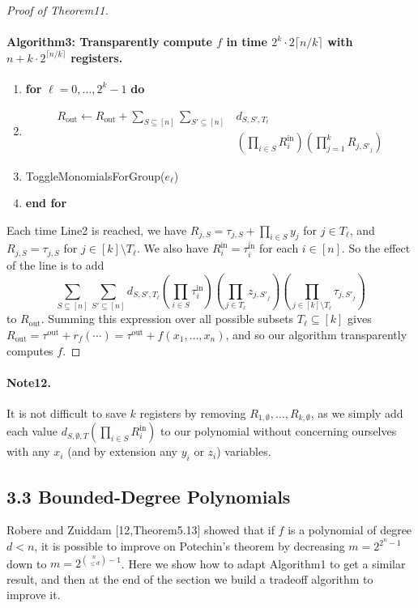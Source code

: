 \documentclass[10pt,a4paper]{article}
\begin{document}
\begin{proof}[Proof of Theorem11]
\paragraph{Algorithm3: Transparently compute $f$ in time $2^k\cdot2\lceil n/k\rceil$ with $n+k\cdot2^{\lceil n/k\rceil}$ registers.}
\begin{enumerate}[label=\arabic*:]
\item \textbf{for} $\ell=0,\ldots,2^k-1$ \textbf{do}
\item \[\begin{aligned}R_{\mathrm{out}}\leftarrow R_{\mathrm{out}}+\sum_{S\subseteq[n]}\sum_{S'\subseteq[n]}&d_{S,S',T_{\ell}}\\
&\mathord{}(\prod_{i\in S}R_i^{\mathrm{in}})(\prod_{j=1}^kR_{j,S'_j})\end{aligned}\]
\item ToggleMonomialsForGroup($e_{\ell}$)
\item \textbf{end for}
\end{enumerate}
Each time Line2 is reached, we have $R_{j,S}=\tau_{j,S}+\prod_{i\in S}y_j$ for $j\in T_{\ell}$, and $R_{j,S}=\tau_{j,S}$ for $j\in[k]\setminus T_{\ell}$. We also have $R_i^{\mathrm{in}}=\tau_i^{\mathrm{in}}$ for each $i\in[n]$. So the effect of the line is to add
\[\sum_{S\subseteq[n]}\sum_{S'\subseteq[n]}d_{S,S',T_{\ell}}\left(\prod_{i\in S}\tau_i^{\mathrm{in}}\right)\left(\prod_{j\in T_{\ell}}z_{j,S'_j}\right)\left(\prod_{j\in[k]\setminus T_{\ell}}\tau_{j,S'_j}\right)\]
to $R_{\mathrm{out}}$. Summing this expression over all possible subsets $T_{\ell}\subseteq[k]$ gives $R_{\mathrm{out}}=\tau^{\mathrm{out}}+r_f(\cdots)=\tau^{\mathrm{out}}+f(x_1,\ldots,x_n)$, and so our algorithm transparently computes $f$.
\end{proof}
\paragraph{Note12.} It is not difficult to save $k$ registers by removing $R_{1,\emptyset},\ldots,R_{k,\emptyset}$, as we simply add each value $d_{S,\emptyset,T}(\prod_{i\in S}R_i^{\mathrm{in}})$ to our polynomial without concerning ourselves with any $x_i$ (and by extension any $y_i$ or $z_i$) variables.

\subsection*{3.3 Bounded-Degree Polynomials}
Robere and Zuiddam [12,Theorem5.13] showed that if $f$ is a polynomial of degree $d<n$, it is possible to improve on Potechin's theorem by decreasing $m=2^{2^n-1}$ down to $m=2^{\binom n{\leq d}-1}$. Here we show how to adapt Algorithm1 to get a similar result, and then at the end of the section we build a tradeoff algorithm to improve it.
\end{document}
